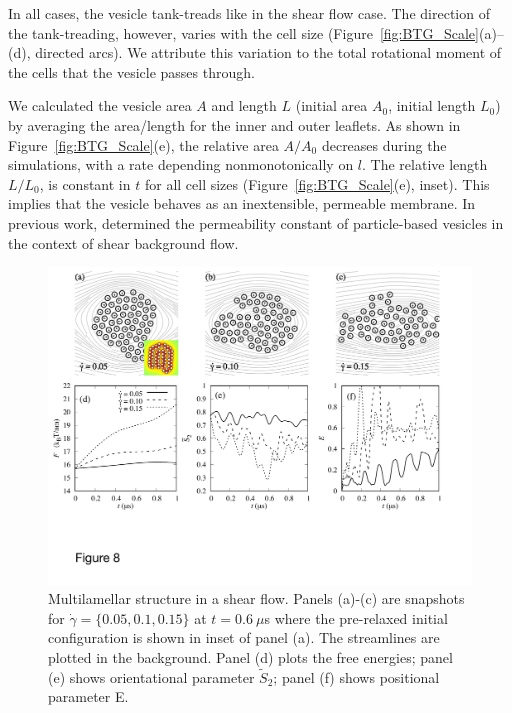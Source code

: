 \documentclass[prb,preprint,showpacs,preprintnumbers,amsmath,amssymb,longbibliography]{revtex4-1}
\begin{document}
In all cases, the vesicle tank-treads like in the shear flow case.
The direction of the tank-treading, however, varies with the cell
size (Figure~\ref{fig:BTG_Scale}(a)--(d), directed arcs).  We attribute
this variation to the total rotational moment of the cells that the vesicle
passes through.

We calculated the vesicle area $A$ and length $L$ (initial area $A_0$, initial length $L_0$)
by averaging the area/length for the inner and outer leaflets.  
As shown in Figure~\ref{fig:BTG_Scale}(e),
the relative area $A/A_0$ decreases during the simulations, with a rate
depending nonmonotonically on $l$.  
The relative length $L/L_0$, is constant in $t$ for all cell sizes (Figure~\ref{fig:BTG_Scale}(e), inset).
This implies that the vesicle behaves as an inextensible, permeable membrane.
In previous work, \cite{Fu2022_JFM} determined the permeability constant of particle-based vesicles
in the context of shear background flow.



\begin{figure}
  \begin{center}
\includegraphics[width=1.0\textwidth]{Figures/Figure8.pdf}
  \end{center}
  \vspace{-20pt}  
  \caption{\label{fig:BC2_shear}
Multilamellar structure in a shear flow. Panels (a)-(c) are snapshots for $\dot \gamma = \{0.05, 0.1, 0.15\}$ at $t=0.6\ \mu$s where the pre-relaxed initial configuration is shown in inset of panel (a). The streamlines are plotted in the background.
Panel (d) plots the free energies; panel (e) shows orientational parameter $\tilde{S}_2$; panel (f) shows positional parameter E.
       }
\end{figure}
\end{document}
